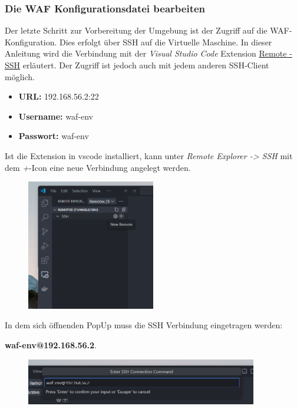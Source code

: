 \subsubsection{Die WAF Konfigurationsdatei bearbeiten}

Der letzte Schritt zur Vorbereitung der Umgebung ist der Zugriff auf die WAF-Konfiguration.
Dies erfolgt über SSH auf die Virtuelle Maschine.
In dieser Anleitung wird die Verbindung mit der \textit{Visual Studio Code} Extension \href{https://marketplace.visualstudio.com/items?itemName=ms-vscode-remote.remote-ssh}{\underline{Remote - SSH}} erläutert.
Der Zugriff ist jedoch auch mit jedem anderen SSH-Client möglich.

\begin{itemize}
    \item \textbf{URL:} 192.168.56.2:22
    \item \textbf{Username:} waf-env
    \item \textbf{Passwort:} waf-env
\end{itemize}

Ist die Extension in vscode installiert, kann unter \textit{Remote Explorer -> SSH} mit dem \textit{+}-Icon eine neue Verbindung angelegt werden.

\begin{figure}[!hbt]
    \centering
    \includegraphics[width=0.5\textwidth]{./images/vscode-new-ssh.png}
\end{figure}

In dem sich öffnenden PopUp muss die SSH Verbindung eingetragen werden:

\textbf{waf-env@192.168.56.2}.

\begin{figure}[!hbt]
    \centering
    \includegraphics[width=0.9\textwidth]{./images/vscode-ssh-string.png}
\end{figure}

